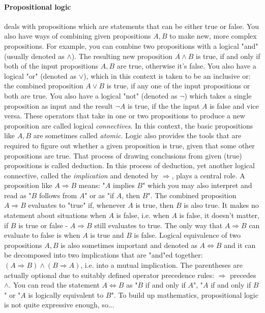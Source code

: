 \paragraph{Propositional logic} deals with propositions which are statements that can be either true or false. You also have ways of combining given propositions $A,B$ to make new, more complex propositions. For example, you can combine two propositions with a logical "and" (usually denoted as $\wedge$). The resulting new proposition $A \wedge B$ is true, if and only if both of the input propositions $A,B$ are true, otherwise it's false. You also have a logical "or" (denoted as $\vee$), which in this context is taken to be an inclusive or: the combined proposition $A \vee B$ is true, if any one of the input propositions or both are true. You also have a logical "not" (denoted as $\neg$) which takes a single proposition as input and the result $\neg A$ is true, if the the input $A$ is false and vice versa. These operators that take in one or two propositions to produce a new proposition are called logical \emph{connectives}. In this context, the basic propositions like $A,B$ are sometimes called \emph{atomic}. Logic also provides the tools that are required to figure out whether a given proposition is true, given that some other propositions are true. That process of drawing conclusions from given (true) propositions is called deduction. In this process of deduction, yet another logical connective, called the \emph{implication} and denoted by $\Rightarrow$, plays a central role. A proposition like $A \Rightarrow B$ means: "$A$ implies $B$" which you may also interpret and read as "$B$ follows from $A$" or as "if $A$, then $B$". The combined proposition $A \Rightarrow B$ evaluates to "true" if, whenever $A$ is true, then $B$ is also true. It makes no statement about situations when $A$ is false, i.e. when $A$ is false, it doesn't matter, if $B$ is true or false - $A \Rightarrow B$ still evaluates to true. The only way that $A \Rightarrow B$ can evaluate to false is when $A$ is true and $B$ is false. Logical equivalence of two propositions $A,B$ is also sometimes important and denoted as $A \Leftrightarrow B$ and it can be decomposed into two implications that are "and"ed together: $(A \Rightarrow B) \wedge (B \Rightarrow A)$, i.e. into a mutual implication. The parentheses are actually optional due to suitably defined operator precedence rules: $\Rightarrow$ precedes $\wedge$. You can read the statement $A \Leftrightarrow B$ as "$B$ if and only if $A$", "$A$ if and only if $B$" or "$A$ is logically equivalent to $B$". To build up mathematics, propositional logic is not quite expressive enough, so...

